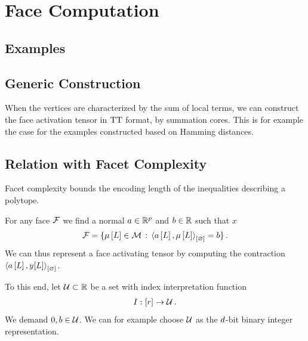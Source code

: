 \section{Face Computation}


\subsection{Examples}





\subsection{Generic Construction}

When the vertices are characterized by the sum of local terms, we can construct the face activation tensor in $\mathrm{TT}$ format, by summation cores.
This is for example the case for the examples constructed based on Hamming distances.

\subsection{Relation with Facet Complexity}

Facet complexity \cite[Definition 6.2.2]{grotschel_geometric_1993} bounds the encoding length of the inequalities describing a polytope.

For any face $\mathcal{F}$ we find a normal $a\in\mathbb{R}^{p}$ and $b\in\mathbb{R}$ such that $x$
\begin{align*}
    \mathcal{F} =
    \{\mu\left[L\right]\in\mathcal{M} \,:\, \left\langle a\left[L\right],\mu\left[L\right]\right\rangle_{\left[ \varnothing \right]}=b \}\, .
\end{align*}
We can thus represent a face activating tensor by computing the contraction $\left\langle a\left[L\right],y[L]\right\rangle_{\left[ \varnothing \right]}$.

To this end, let $\mathcal{U}\subset\mathbb{R}$ be a set with index interpretation function
\begin{align*}
    I : [r] \rightarrow \mathcal{U} \, .
\end{align*}
We demand $0,b\in\mathcal{U}$.
We can for example choose $\mathcal{U}$ as the $d$-bit binary integer representation.

